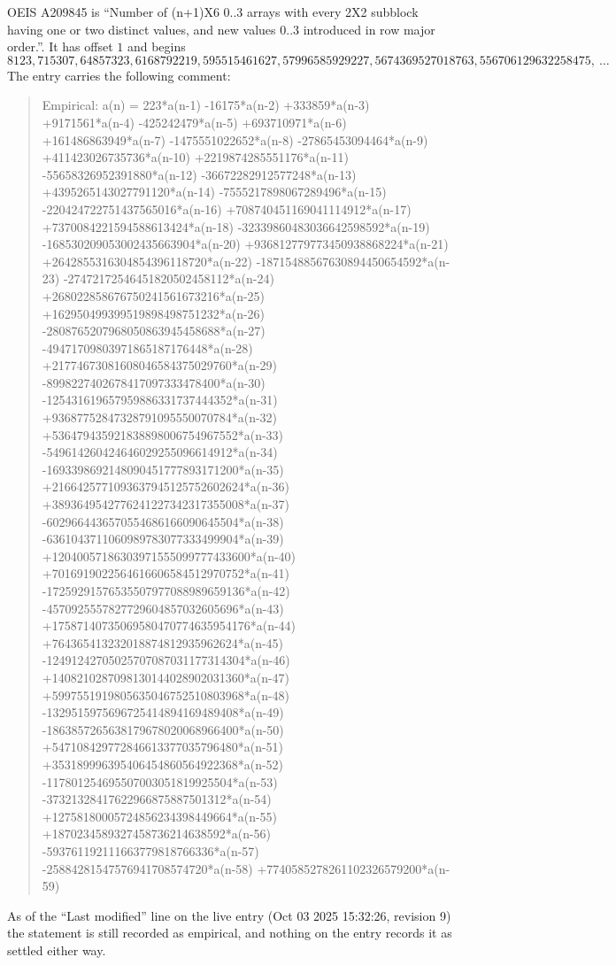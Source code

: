 \documentclass[11pt,a4paper]{article}
\theoremstyle{plain}
\theoremstyle{definition}
\begin{document}
OEIS A209845 is ``Number of (n+1)X6 0..3 arrays with every 2X2 subblock having one or two distinct values, and new values 0..3 introduced in row major order.''. It has offset $1$ and begins
\[
8123, 715307, 64857323, 6168792219, 595515461627, 57996585929227, 5674369527018763, 556706129632258475,\ \dots
\]
The entry carries the following comment:
\begin{quote}\small
Empirical: a(n) = 223*a(n-1) -16175*a(n-2) +333859*a(n-3) +9171561*a(n-4) -425242479*a(n-5) +693710971*a(n-6) +161486863949*a(n-7) -1475551022652*a(n-8) -27865453094464*a(n-9) +411423026735736*a(n-10) +2219874285551176*a(n-11) -55658326952391880*a(n-12) -36672282912577248*a(n-13) +4395265143027791120*a(n-14) -7555217898067289496*a(n-15) -220424722751437565016*a(n-16) +708740451169041114912*a(n-17) +7370084221594588613424*a(n-18) -32339860483036642598592*a(n-19) -168530209053002435663904*a(n-20) +936812779773450938868224*a(n-21) +2642855316304854396118720*a(n-22) -18715488567630894450654592*a(n-23) -27472172546451820502458112*a(n-24) +268022858676750241561673216*a(n-25) +162950499399519898498751232*a(n-26) -2808765207968050863945458688*a(n-27) -49471709803971865187176448*a(n-28) +21774673081608046584375029760*a(n-29) -8998227402678417097333478400*a(n-30) -125431619657959886331737444352*a(n-31) +93687752847328791095550070784*a(n-32) +536479435921838898006754967552*a(n-33) -549614260424646029255096614912*a(n-34) -1693398692148090451777893171200*a(n-35) +2166425771093637945125752602624*a(n-36) +3893649542776241227342317355008*a(n-37) -6029664436570554686166090645504*a(n-38) -6361043711060989783077333499904*a(n-39) +12040057186303971555099777433600*a(n-40) +7016919022564616606584512970752*a(n-41) -17259291576535507977088989659136*a(n-42) -4570925557827729604857032605696*a(n-43) +17587140735069580470774635954176*a(n-44) +764365413232018874812935962624*a(n-45) -12491242705025707087031177314304*a(n-46) +1408210287098130144028902031360*a(n-47) +5997551919805635046752510803968*a(n-48) -1329515975696725414894169489408*a(n-49) -1863857265638179678020068966400*a(n-50) +547108429772846613377035796480*a(n-51) +353189996395406454860564922368*a(n-52) -117801254695507003051819925504*a(n-53) -37321328417622966875887501312*a(n-54) +12758180005724856234398449664*a(n-55) +1870234589327458736214638592*a(n-56) -593761192111663779818766336*a(n-57) -25884281547576941708574720*a(n-58) +7740585278261102326579200*a(n-59)
\end{quote}
As of the ``Last modified'' line on the live entry (Oct 03 2025 15:32:26, revision 9) the statement is
still recorded as empirical, and nothing on the entry records it as settled either way.
\end{document}
